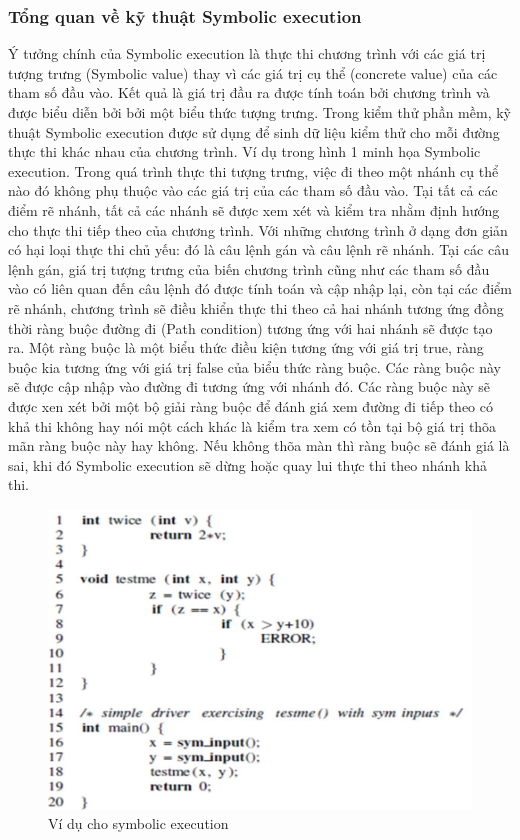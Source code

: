 \documentclass[12pt,a4paper]{article}
\begin{document}
\subsubsection{Tổng quan về kỹ thuật Symbolic execution}
Ý tưởng chính của Symbolic execution là thực thi chương trình với các giá trị tượng trưng (Symbolic value) thay vì các giá trị cụ thể (concrete value) của các tham số đầu vào. Kết quả là giá trị đầu ra được tính toán bởi chương trình và được biểu diễn bởi bởi một biểu thức tượng trưng. Trong kiểm thử phần mềm, kỹ thuật Symbolic execution được sử dụng để sinh dữ liệu kiểm thử cho mỗi đường thực thi khác nhau của chương trình. Ví dụ trong hình 1 minh họa Symbolic execution.\newline
\indent Trong quá trình thực thi tượng trưng, việc đi theo một nhánh cụ thể nào đó không phụ thuộc vào các giá trị của các tham số đầu vào. Tại tất cả các điểm rẽ nhánh, tất cả các nhánh sẽ được xem xét và kiểm tra nhằm định hướng cho thực thi tiếp theo của chương trình. Với những chương trình ở dạng đơn giản có hại loại thực thi chủ yếu: đó là câu lệnh gán và câu lệnh rẽ nhánh. Tại các câu lệnh gán, giá trị tượng trưng của biến chương trình cũng như các tham số đầu vào có liên quan đến câu lệnh đó được tính toán và cập nhập lại, còn tại các điểm rẽ nhánh, chương trình sẽ điều khiển thực thi theo cả hai nhánh tương ứng đồng thời ràng buộc đường đi (Path condition) tương ứng với hai nhánh sẽ được tạo ra. Một ràng buộc là một biểu thức điều kiện tương ứng với giá trị true, ràng buộc kia tương ứng với giá trị false của biểu thức ràng buộc. Các ràng buộc này sẽ được cập nhập vào đường đi tương ứng với nhánh đó. Các ràng buộc này sẽ được xen xét bởi một bộ giải ràng buộc để đánh giá xem đường đi tiếp theo có khả thi không hay nói một cách khác là kiểm tra xem có tồn tại bộ giá trị thõa mãn ràng buộc này hay không. Nếu không thõa màn thì ràng buộc sẽ đánh giá là sai, khi đó Symbolic execution sẽ dừng hoặc quay lui thực thi theo nhánh khả thi.\newline
\begin{figure}[ht]
\begin{center}
\includegraphics{hinhanh/hinh1}
\end{center}
\caption{Ví dụ cho symbolic execution}
\end{figure}
\end{document}
